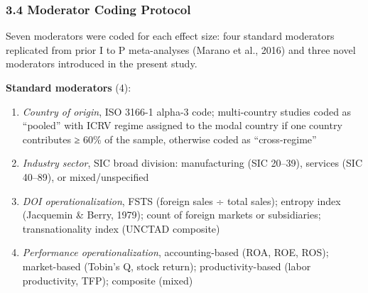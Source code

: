\documentclass[
  12pt,a4paper]{article}
\providecommand{\tightlist}{%
  \setlength{\itemsep}{0pt}\setlength{\parskip}{0pt}}
\begin{document}
\hypertarget{moderator-coding-protocol}{%
\subsubsection{3.4 Moderator Coding
Protocol}\label{moderator-coding-protocol}}

Seven moderators were coded for each effect size: four standard
moderators replicated from prior I to P meta-analyses (Marano et al.,
2016) and three novel moderators introduced in the present study.

\textbf{Standard moderators} (4):

\begin{enumerate}
\def\labelenumi{\arabic{enumi}.}
\tightlist
\item
  \emph{Country of origin}, ISO 3166-1 alpha-3 code; multi-country
  studies coded as ``pooled'' with ICRV regime assigned to the modal
  country if one country contributes ≥ 60\% of the sample, otherwise
  coded as ``cross-regime''
\item
  \emph{Industry sector}, SIC broad division: manufacturing (SIC
  20--39), services (SIC 40--89), or mixed/unspecified
\item
  \emph{DOI operationalization}, FSTS (foreign sales ÷ total sales);
  entropy index (Jacquemin \& Berry, 1979); count of foreign markets or
  subsidiaries; transnationality index (UNCTAD composite)
\item
  \emph{Performance operationalization}, accounting-based (ROA, ROE,
  ROS); market-based (Tobin's Q, stock return); productivity-based
  (labor productivity, TFP); composite (mixed)
\end{enumerate}
\end{document}
